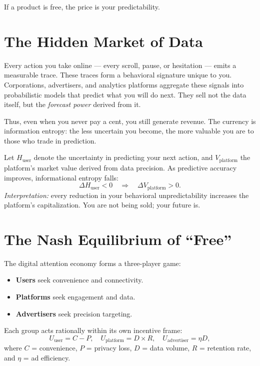 \documentclass[12pt,twoside]{book}
\begin{document}
\begin{keyidea}
If a product is free, the price is your predictability.
\end{keyidea}

\section{The Hidden Market of Data}

Every action you take online --- every scroll, pause, or hesitation --- emits a measurable trace.  
These traces form a behavioral signature unique to you.  
Corporations, advertisers, and analytics platforms aggregate these signals into probabilistic models that predict what you will do next.  
They sell not the data itself, but the \emph{forecast power} derived from it.  

Thus, even when you never pay a cent, you still generate revenue.  
The currency is information entropy: the less uncertain you become, the more valuable you are to those who trade in prediction.

\begin{tcolorbox}[colback=gray!5,colframe=gray!60,boxrule=0.4pt,arc=1mm,
title={Mathematical Interlude: Entropy and Value}]
Let $H_{\text{user}}$ denote the uncertainty in predicting your next action, and $V_{\text{platform}}$ the platform’s market value derived from data precision.  
As predictive accuracy improves, informational entropy falls:
\[
\Delta H_{\text{user}} < 0 \quad \Rightarrow \quad \Delta V_{\text{platform}} > 0.
\]
\textit{Interpretation:} every reduction in your behavioral unpredictability increases the platform’s capitalization.  
You are not being sold; your future is.
\end{tcolorbox}

\section{The Nash Equilibrium of “Free”}

The digital attention economy forms a three-player game:
\begin{itemize}
  \item \textbf{Users} seek convenience and connectivity.  
  \item \textbf{Platforms} seek engagement and data.  
  \item \textbf{Advertisers} seek precision targeting.
\end{itemize}

Each group acts rationally within its own incentive frame:
\[
U_{\text{user}} = C - P,\quad 
U_{\text{platform}} = D \times R,\quad 
U_{\text{advertiser}} = \eta D,
\]
where $C$ = convenience, $P$ = privacy loss, $D$ = data volume, $R$ = retention rate, and $\eta$ = ad efficiency.  
\end{document}
